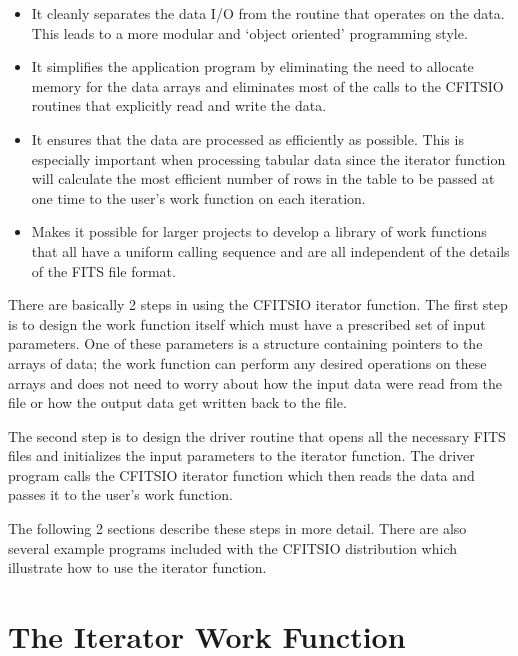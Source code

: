 \documentclass[11pt]{book}
\begin{document}
\begin{itemize}
\item
It cleanly separates the data I/O from the routine that operates on
the data.  This leads to a more modular and `object oriented'
programming style.

\item
It simplifies the application program by eliminating the need to allocate
memory for the data arrays and eliminates most of the calls to the CFITSIO
routines that explicitly read and write the data.

\item
It ensures that the data are processed as efficiently as possible.
This is especially important when processing tabular data since
the iterator function will calculate the most efficient number
of rows in the table to be passed at one time to the user's work
function on each iteration.

\item
Makes it possible for larger projects to develop a library of work
functions that all have a uniform calling sequence and are all
independent of the details of the FITS file format.

\end{itemize}

There are basically 2 steps in using the CFITSIO iterator function.
The first step is to design the work function itself which must have a
prescribed set of input parameters.  One of these parameters is a
structure containing pointers to the arrays of data; the work function
can perform any desired operations on these arrays and does not need to
worry about how the input data were read from the file or how the
output data get written back to the file.

The second step is to design the driver routine that opens all the
necessary FITS files and initializes  the input parameters to the
iterator function.  The driver program calls the CFITSIO iterator
function which then reads the data and passes it to the user's work
function.

The following 2 sections describe these steps in more detail.  There
are also several example programs included with the CFITSIO
distribution which illustrate how to use the iterator function.


\section{The Iterator Work Function}
\end{document}
